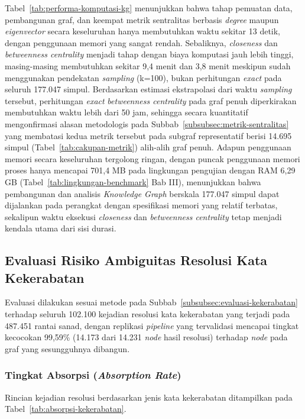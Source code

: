 Tabel~\ref{tab:performa-komputasi-kg} menunjukkan bahwa tahap pemuatan data, pembangunan graf, dan keempat metrik sentralitas berbasis \textit{degree} maupun \textit{eigenvector} secara keseluruhan hanya membutuhkan waktu sekitar 13 detik, dengan penggunaan memori yang sangat rendah. Sebaliknya, \textit{closeness} dan \textit{betweenness centrality} menjadi tahap dengan biaya komputasi jauh lebih tinggi, masing-masing membutuhkan sekitar 9,4 menit dan 3,8 menit meskipun sudah menggunakan pendekatan \textit{sampling} (k=100), bukan perhitungan \textit{exact} pada seluruh 177.047 simpul. Berdasarkan estimasi ekstrapolasi dari waktu \textit{sampling} tersebut, perhitungan \textit{exact} \textit{betweenness centrality} pada graf penuh diperkirakan membutuhkan waktu lebih dari 50 jam, sehingga secara kuantitatif mengonfirmasi alasan metodologis pada Subbab~\ref{subsubsec:metrik-sentralitas} yang membatasi kedua metrik tersebut pada subgraf representatif berisi 14.695 simpul (Tabel~\ref{tab:cakupan-metrik}) alih-alih graf penuh. Adapun penggunaan memori secara keseluruhan tergolong ringan, dengan puncak penggunaan memori proses hanya mencapai 701,4 MB pada lingkungan pengujian dengan RAM 6,29 GB (Tabel~\ref{tab:lingkungan-benchmark} Bab III), menunjukkan bahwa pembangunan dan analisis \textit{Knowledge Graph} berskala 177.047 simpul dapat dijalankan pada perangkat dengan spesifikasi memori yang relatif terbatas, sekalipun waktu eksekusi \textit{closeness} dan \textit{betweenness centrality} tetap menjadi kendala utama dari sisi durasi.

\subsection{Evaluasi Risiko Ambiguitas Resolusi Kata Kekerabatan}
\label{subsec:evaluasi-kekerabatan-hasil}
Evaluasi dilakukan sesuai metode pada Subbab~\ref{subsubsec:evaluasi-kekerabatan} terhadap seluruh 102.100 kejadian resolusi kata kekerabatan yang terjadi pada 487.451 rantai sanad, dengan replikasi \textit{pipeline} yang tervalidasi mencapai tingkat kecocokan 99,59\% (14.173 dari 14.231 \textit{node} hasil resolusi) terhadap \textit{node} pada graf yang sesungguhnya dibangun.

\subsubsection{Tingkat Absorpsi (\textit{Absorption Rate})}
Rincian kejadian resolusi berdasarkan jenis kata kekerabatan ditampilkan pada Tabel~\ref{tab:absorpsi-kekerabatan}.

